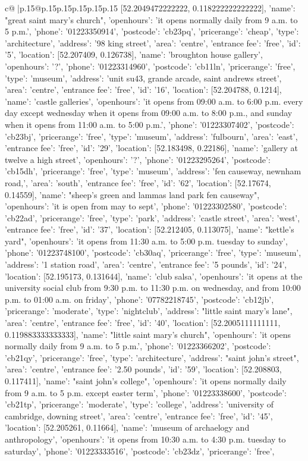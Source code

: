 \documentclass{article}
\begin{document}
{\begin{supertabular}{c@{$\;$}|p{.15\linewidth}@{}p{.15\linewidth}p{.15\linewidth}p{.15\linewidth}p{.15\linewidth}p{.15\linewidth}}
{{{[52.2049472222222, 0.118222222222222], 'name': "great saint mary's church", 'openhours': 'it opens normally daily from 9 a.m. to 5 p.m.', 'phone': '01223350914', 'postcode': 'cb23pq', 'pricerange': 'cheap', 'type': 'architecture'}, {'address': '98 king street', 'area': 'centre', 'entrance fee': 'free', 'id': '5', 'location': [52.207409, 0.126738], 'name': 'broughton house gallery', 'openhours': '?', 'phone': '01223314960', 'postcode': 'cb11ln', 'pricerange': 'free', 'type': 'museum'}, {'address': 'unit su43, grande arcade, saint andrews street', 'area': 'centre', 'entrance fee': 'free', 'id': '16', 'location': [52.204788, 0.1214], 'name': 'castle galleries', 'openhours': 'it opens from 09:00 a.m. to 6:00 p.m. every day except wednesday when it opens from 09:00 a.m. to 8:00 p.m., and sunday when it opens from 11:00 a.m. to 5:00 p.m.', 'phone': '01223307402', 'postcode': 'cb23bj', 'pricerange': 'free', 'type': 'museum'}, {'address': 'fulbourn', 'area': 'east', 'entrance fee': 'free', 'id': '29', 'location': [52.183498, 0.22186], 'name': 'gallery at twelve a high street', 'openhours': '?', 'phone': '01223295264', 'postcode': 'cb15dh', 'pricerange': 'free', 'type': 'museum'}, {'address': 'fen causeway, newnham road,', 'area': 'south', 'entrance fee': 'free', 'id': '62', 'location': [52.17674, 0.14559], 'name': "sheep's green and lammas land park fen causeway", 'openhours': 'it is open from may to sept', 'phone': '01223302580', 'postcode': 'cb22ad', 'pricerange': 'free', 'type': 'park'}, {'address': 'castle street', 'area': 'west', 'entrance fee': 'free', 'id': '37', 'location': [52.212405, 0.113075], 'name': "kettle's yard", 'openhours': 'it opens from 11:30 a.m. to 5:00 p.m. tuesday to sunday', 'phone': '01223748100', 'postcode': 'cb30aq', 'pricerange': 'free', 'type': 'museum'}, {'address': '1 station road', 'area': 'centre', 'entrance fee': '5 pounds', 'id': '24', 'location': [52.195173, 0.131644], 'name': 'club salsa', 'openhours': 'it opens at the university social club from 9:30 p.m. to 11:30 p.m. on wednesday, and from 10:00 p.m. to 01:00 a.m. on friday', 'phone': '07782218745', 'postcode': 'cb12jb', 'pricerange': 'moderate', 'type': 'nightclub'}, {'address': "little saint mary's lane", 'area': 'centre', 'entrance fee': 'free', 'id': '40', 'location': [52.2005111111111, 0.119883333333333], 'name': "little saint mary's church", 'openhours': 'it opens normally daily from 9 a.m. to 5 p.m.', 'phone': '01223366202', 'postcode': 'cb21qy', 'pricerange': 'free', 'type': 'architecture'}, {'address': "saint john's street", 'area': 'centre', 'entrance fee': '2.50 pounds', 'id': '59', 'location': [52.208803, 0.117411], 'name': "saint john's college", 'openhours': 'it opens normally daily from 9 a.m. to 5 p.m. except easter term', 'phone': '01223338600', 'postcode': 'cb21tp', 'pricerange': 'moderate', 'type': 'college'}, {'address': 'university of cambridge, downing street', 'area': 'centre', 'entrance fee': 'free', 'id': '45', 'location': [52.205261, 0.11664], 'name': 'museum of archaelogy and anthropology', 'openhours': 'it opens from 10:30 a.m. to 4:30 p.m. tuesday to saturday', 'phone': '01223333516', 'postcode': 'cb23dz', 'pricerange': 'free', }}}
\end{supertabular}}
\end{document}
